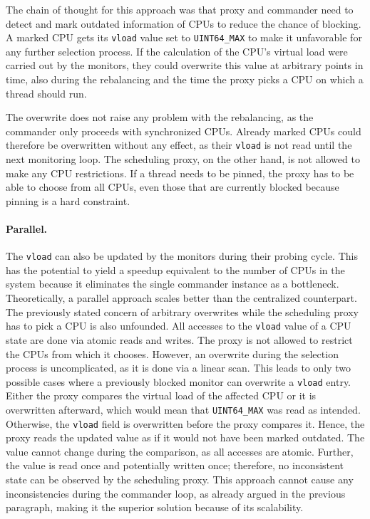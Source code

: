 The chain of thought for this approach was that proxy and commander need to detect and mark outdated information of CPUs to reduce the chance of blocking.
A marked CPU gets its \texttt{vload} value set to \texttt{UINT64\_MAX} to make it unfavorable for any further selection process.
If the calculation of the CPU's virtual load were carried out by the monitors, they could overwrite this value at arbitrary points in time, also during the rebalancing and the time the proxy picks a CPU on which a thread should run.

The overwrite does not raise any problem with the rebalancing, as the commander only proceeds with synchronized CPUs.
Already marked CPUs could therefore be overwritten without any effect, as their \texttt{vload} is not read until the next monitoring loop.
The scheduling proxy, on the other hand, is not allowed to make any CPU restrictions.
If a thread needs to be pinned, the proxy has to be able to choose from all CPUs, even those that are currently blocked because pinning is a hard constraint.

\paragraph{Parallel.}

The \texttt{vload} can also be updated by the monitors during their probing cycle.
This has the potential to yield a speedup equivalent to the number of CPUs in the system because it eliminates the single commander instance as a bottleneck.
Theoretically, a parallel approach scales better than the centralized counterpart.
The previously stated concern of arbitrary overwrites while the scheduling proxy has to pick a CPU is also unfounded.
All accesses to the \texttt{vload} value of a CPU state are done via atomic reads and writes.
The proxy is not allowed to restrict the CPUs from which it chooses.
However, an overwrite during the selection process is uncomplicated, as it is done via a linear scan.
This leads to only two possible cases where a previously blocked monitor can overwrite a \texttt{vload} entry.
Either the proxy compares the virtual load of the affected CPU or it is overwritten afterward, which would mean that \texttt{UINT64\_MAX} was read as intended.
Otherwise, the \texttt{vload} field is overwritten before the proxy compares it.
Hence, the proxy reads the updated value as if it would not have been marked outdated.
The value cannot change during the comparison, as all accesses are atomic.
Further, the value is read once and potentially written once; therefore, no inconsistent state can be observed by the scheduling proxy.
This approach cannot cause any inconsistencies during the commander loop, as already argued in the previous paragraph, making it the superior solution because of its scalability.


